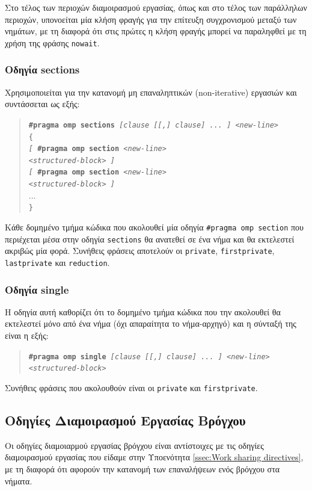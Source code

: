 Στο τέλος των περιοχών διαμοιρασμού εργασίας, όπως και στο τέλος των παράλληλων περιοχών, υπονοείται μία κλήση φραγής για την επίτευξη συγχρονισμού μεταξύ των νημάτων, με τη διαφορά ότι στις πρώτες η κλήση φραγής μπορεί να παραληφθεί με τη χρήση της φράσης \texttt{nowait}.

\subsubsection{Οδηγία sections}
Χρησιμοποιείται για την κατανομή μη επαναληπτικών (non-iterative) εργασιών και συντάσσεται ως εξής:
\begin{quote}
	\texttt{\textbf{\#pragma omp sections} \textit{[clause [[,] clause] ... ] <new-line>}} \\
	\texttt{\{} \\
		\texttt{\textit{[} \textbf{\#pragma omp section} \textit{<new-line>}} \\
		\texttt{\textit{<structured-block> ]}} \\
		\texttt{\textit{[} \textbf{\#pragma omp section} \textit{<new-line>}} \\
		\texttt{\textit{<structured-block> ]}} \\
		... \\
	\texttt{\}}
\end{quote}

Κάθε δομημένο τμήμα κώδικα που ακολουθεί μία οδηγία \texttt{\#pragma omp section} που περιέχεται μέσα στην οδηγία \texttt{sections} θα ανατεθεί σε ένα νήμα και θα εκτελεστεί ακριβώς μία φορά. Συνήθεις φράσεις αποτελούν οι \texttt{private}, \texttt{firstprivate}, \texttt{lastprivate} και \texttt{reduction}.

\subsubsection{Οδηγία single}
Η οδηγία αυτή καθορίζει ότι το δομημένο τμήμα κώδικα που την ακολουθεί θα εκτελεστεί μόνο από ένα νήμα (όχι απαραίτητα το νήμα-αρχηγό) και η σύνταξή της είναι η εξής:
\begin{quote}
	\texttt{\textbf{\#pragma omp single} \textit{[clause [[,] clause] ... ] <new-line>}} \\
		\texttt{\textit{<structured-block>}}
\end{quote}

Συνήθεις φράσεις που ακολουθούν είναι οι \texttt{private} και \texttt{firstprivate}.


\subsection{Οδηγίες Διαμοιρασμού Εργασίας Βρόγχου}
Οι οδηγίες διαμοιαρμού εργασίας βρόγχου είναι αντίστοιχες με τις οδηγίες διαμοιρασμού εργασίας που είδαμε στην Υποενότητα \ref{ssec:Work sharing directives}, με τη διαφορά ότι αφορούν την κατανομή των επαναλήψεων ενός βρόγχου στα νήματα.


